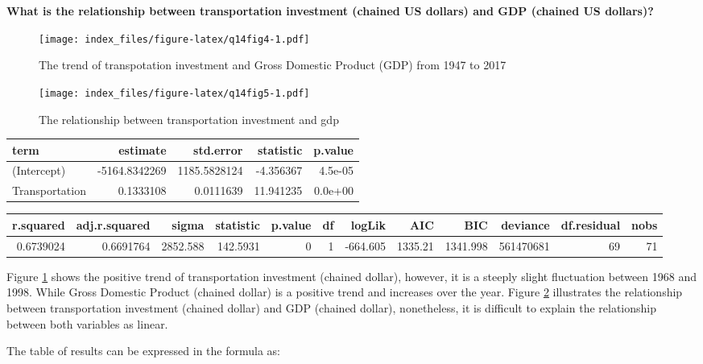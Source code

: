 \documentclass[
]{article}
\begin{document}
\textbf{What is the relationship between transportation investment (chained US dollars) and GDP (chained US dollars)?}

\begin{figure}
\centering
\texttt{[image: index\_files/figure-latex/q14fig4-1.pdf]}
\caption{\label{fig:q14fig4}The trend of transpotation investment and Gross Domestic Product (GDP) from 1947 to 2017}
\end{figure}

\begin{figure}
\centering
\texttt{[image: index\_files/figure-latex/q14fig5-1.pdf]}
\caption{\label{fig:q14fig5}The relationship between transportation investment and gdp}
\end{figure}

\begin{table}
\centering
\begin{tabular}{l|r|r|r|r}
\hline
term & estimate & std.error & statistic & p.value\\
\hline
(Intercept) & -5164.8342269 & 1185.5828124 & -4.356367 & 4.5e-05\\
\hline
Transportation & 0.1333108 & 0.0111639 & 11.941235 & 0.0e+00\\
\hline
\end{tabular}
\end{table}

\begin{table}
\centering
\begin{tabular}{r|r|r|r|r|r|r|r|r|r|r|r}
\hline
r.squared & adj.r.squared & sigma & statistic & p.value & df & logLik & AIC & BIC & deviance & df.residual & nobs\\
\hline
0.6739024 & 0.6691764 & 2852.588 & 142.5931 & 0 & 1 & -664.605 & 1335.21 & 1341.998 & 561470681 & 69 & 71\\
\hline
\end{tabular}
\end{table}

Figure \ref{fig:q14fig4} shows the positive trend of transportation investment (chained dollar), however, it is a steeply slight fluctuation between 1968 and 1998. While Gross Domestic Product (chained dollar) is a positive trend and increases over the year. Figure \ref{fig:q14fig5} illustrates the relationship between transportation investment (chained dollar) and GDP (chained dollar), nonetheless, it is difficult to explain the relationship between both variables as linear.

The table of results can be expressed in the formula as:
\end{document}
